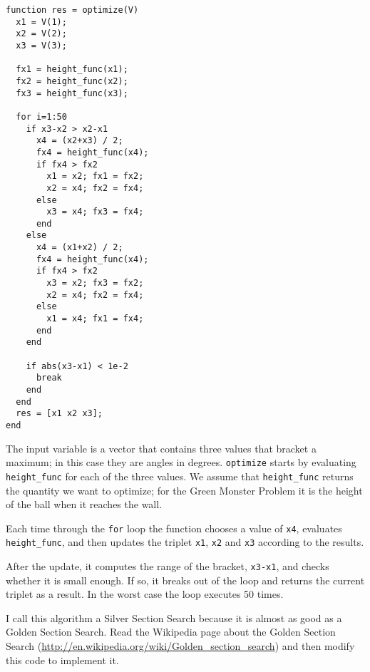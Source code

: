 \begin{verbatim}
function res = optimize(V)
  x1 = V(1);
  x2 = V(2);
  x3 = V(3);
  
  fx1 = height_func(x1);
  fx2 = height_func(x2);
  fx3 = height_func(x3);
  
  for i=1:50
    if x3-x2 > x2-x1
      x4 = (x2+x3) / 2;
      fx4 = height_func(x4);
      if fx4 > fx2
        x1 = x2; fx1 = fx2;
        x2 = x4; fx2 = fx4;
      else
        x3 = x4; fx3 = fx4;
      end
    else
      x4 = (x1+x2) / 2;
      fx4 = height_func(x4);
      if fx4 > fx2
        x3 = x2; fx3 = fx2;
        x2 = x4; fx2 = fx4;
      else
        x1 = x4; fx1 = fx4;
      end
    end

    if abs(x3-x1) < 1e-2
      break
    end
  end
  res = [x1 x2 x3];
end
\end{verbatim}

The input variable is a vector that contains three values that bracket
a maximum; in this case they are angles in degrees. {\tt optimize}
starts by evaluating {\tt height\_func} for each of the three values.
We assume that {\tt height\_func} returns the quantity we want to
optimize; for the Green Monster Problem it is the height of
the ball when it reaches the wall.

Each time through the {\tt for} loop the function chooses a value
of {\tt x4}, evaluates {\tt height\_func}, and then updates the
triplet {\tt x1}, {\tt x2} and {\tt x3} according to the results.

After the update, it computes the range of the bracket, {\tt x3-x1},
and checks whether it is small enough. If so, it breaks out of
the loop and returns the current triplet as a result. In the
worst case the loop executes 50 times.

\begin{ex}
I call this algorithm a Silver Section Search because it is almost as
good as a Golden Section Search. Read the Wikipedia page about the
Golden Section Search
(\url{http://en.wikipedia.org/wiki/Golden_section_search}) and then
modify this code to implement it.
\end{ex}

